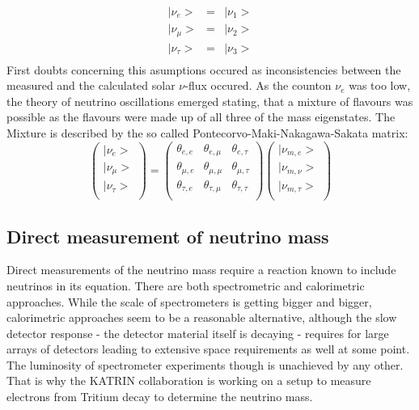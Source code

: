     \begin{equation}
	\begin{array}{ccc}
      	|\nu_e>		& = & |\nu_1>\\
      	|\nu_\mu>	& = & |\nu_2>\\
      	|\nu_\tau>	& = & |\nu_3>\\
    	 \end{array}
    \end{equation}
    First doubts concerning this asumptions occured as inconsistencies between the measured and the calculated solar $\nu$-flux occured. As the counton $\nu_e$ was too low, the theory of neutrino oscillations emerged stating, that a mixture of flavours was possible as the flavours were made up of all three of the mass eigenstates. The Mixture is described by the so called Pontecorvo-Maki-Nakagawa-Sakata matrix:
        \begin{equation}
        \left(
        \begin{array}{c}
	  |\nu_e>\\
	  |\nu_\mu>\\
	  |\nu_\tau>\\
        \end{array}
        \right)
	 = \left(
	\begin{array}{ccc}
      	\theta_{e,e} & \theta_{e,\mu} & \theta_{e,\tau}\\
      	\theta_{\mu,e} & \theta_{\mu,\mu} & \theta_{\mu,\tau}\\
      	\theta_{\tau,e} & \theta_{\tau,\mu} & \theta_{\tau,\tau}\\
      	\end{array}
	\right)
	\left(
	\begin{array}{c}
      	|\nu_{m,e}>\\
      	|\nu_{m,\nu}>\\
      	|\nu_{m,\tau}>\\
    	 \end{array}
    	 \right)
    \end{equation}
    
    \subsection{Direct measurement of neutrino mass}
    \label{ch:Introduction:sec:Massive neutrino:subsec:direct Neutrino Mass measurement}
    Direct measurements of the neutrino mass require a reaction known to include neutrinos in its equation. There are both spectrometric and calorimetric approaches. While the scale of spectrometers is getting bigger and bigger, calorimetric approaches seem to be a reasonable alternative, although the slow detector response - the detector material itself is decaying - requires for large arrays of detectors leading to extensive space requirements as well at some point. The luminosity of spectrometer experiments though is unachieved by any other. That is why the KATRIN collaboration is working on a setup to measure electrons from Tritium decay to determine the neutrino mass. 
     
